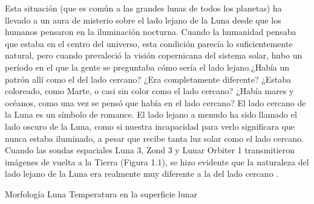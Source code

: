 \documentclass[12pt]{article}
\begin{document}
Esta situación (que es común a las grandes lunas de todos los planetas) ha llevado a un aura de 
misterio sobre el lado lejano de la Luna desde que los humanos pensaron en la iluminación nocturna. 
Cuando la humanidad pensaba que estaba en el centro del universo, esta condición parecía lo 
suficientemente natural, pero cuando prevaleció la visión copernicana del sistema solar, hubo un 
período en el que la gente se preguntaba cómo sería el lado lejano.¿Había un patrón allí como el del 
lado cercano? ¿Era completamente diferente? ¿Estaba coloreado, como Marte, o casi sin color como el 
lado cercano? ¿Había mares y océanos, como una vez se pensó que había en el lado cercano?
El lado cercano de la Luna es un símbolo de romance. El lado lejano a menudo ha sido llamado el 
lado oscuro de la Luna, como si nuestra incapacidad para verlo significara que nunca estaba iluminado, a pesar
que recibe tanta luz solar como el lado cercano. Cuando las sondas espaciales Luna 3, Zond 3 y Lunar Orbiter 
1 transmitieron imágenes de vuelta a la Tierra (Figura 1.1), se hizo evidente que la naturaleza del 
lado lejano de la Luna era realmente muy diferente a la del lado cercano \parencite{byrne2008far}.

Morfología Luna \parencite{PhysicsandAstronomyMoon}
Temperatura en la superficie lunar \parencite{Zhengling2024}
\end{document}
